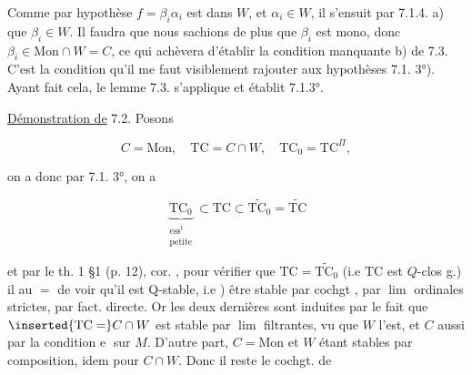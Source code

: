 

Comme par hypothèse $f=\beta_i\alpha_i$ est dans $W$, et $\alpha_i\in W$, il s'ensuit par 7.1.4. a) que $\beta_i\in W$. Il faudra que nous sachions de plus que $\beta_i$ est mono, donc $\beta_i\in\mathrm{Mon}\cap W=C$, ce qui achèvera  d'établir la condition manquante b) de 7.3. C'est la condition  qu'il me faut visiblement rajouter aux hypothèses  7.1. 3°). Ayant fait cela, le lemme 7.3. s'applique et établit 7.1.3°.

\uline{Démonstration de} 7.2. Posons

\[
C=\mathrm{Mon},\quad\mathrm{TC}=C\cap W,\quad\mathrm{TC}_0=\mathrm{TC}^{\Pi},
\]

on a donc par 7.1. 3°, on a

\[
\underbrace{\mathrm{TC}_0}_{\substack{\text{ess}^{\mathrm{t}}\\\text{petite}}}\subset\mathrm{TC}\subset\widetilde{\mathrm{TC}_0}=\widetilde{\mathrm{TC}}
\]

et par le th. 1 \S1 (p. 12), cor. , pour vérifier que $\mathrm{TC}=\widetilde{\mathrm{TC}_0}$ (i.e $\mathrm{TC}$ est $Q$-clos  g.) il   au $=$ de voir qu'il est Q-stable, i.e ) être stable par  cochgt  , par \uline{$\lim$} ordinales strictes, par fact. directe. Or les deux dernières sont induites par le fait que $\inserted{\mathrm{TC}=}C\cap W$ est stable par \uline{$\lim$} filtrantes, vu que $W$ l'est, et $C$ aussi par la condition \textcircled{e}  sur $M$. D'autre part, $C=\mathrm{Mon}$ et $W$ étant stables par composition, idem pour $C\cap W$. Donc il reste le cochgt. de
